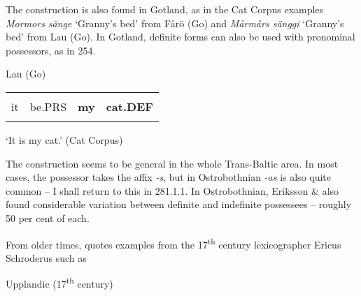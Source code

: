 \begin{styleBodytextC}
The construction is also found in Gotland, as in the Cat Corpus examples \textit{Mormors sänge} ‘Granny’s bed’ from Fårö (Go) and \textit{Mårmårs sänggi }‘Granny’s bed’ from Lau (Go). In Gotland, definite forms can also be used with pronominal possessors, as in 254.

\end{styleBodytextC}

\begin{listWWNumileveli}
\item {}

\begin{styleExample}
\label{bkm:Ref155247297}Lau (Go)

\end{styleExample}

\end{listWWNumileveli}

\begin{tabular}{llll}
\lsptoprule
\multicolumn{4}{l}{De

}\\
it & be.PRS & {\bfseries my} & {\bfseries cat.DEF}\\
\lspbottomrule
\end{tabular}

\begin{styleTranslation}
 ‘It is my cat.’ (Cat Corpus)

\end{styleTranslation}

\begin{styleBodyTextFirst}
The construction seems to be general in the whole Trans-Baltic area. In most cases, the possessor takes the affix\textit{ -s}, but in Ostrobothnian\textit{ -as }is also quite common – I shall return to this in 281.1.1. In Ostrobothnian, Eriksson \& \citet{Rendahl1999} also found considerable variation between definite and indefinite possessees – roughly 50 per cent of each. 

\end{styleBodyTextFirst}

\begin{styleBodytextC}
From older times, \citet[523]{Hesselman1908} quotes examples from the 17\textsuperscript{th} century lexicographer Ericus Schroderus such as

\end{styleBodytextC}

\begin{listWWNumileveli}
\item {}

\begin{styleExample}
Upplandic (17\textsuperscript{th} century)

\end{styleExample}

\end{listWWNumileveli}

